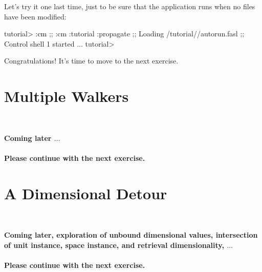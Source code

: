 \documentclass[10pt,twoside,english,pdftex]{article}
\begin{document}
Let's try it one last time, just to be sure that the application runs when no
files have been modified:
%
\W\supp
\begin{smallexample}
\textcolor{darkergray}{%
  tutorial> \textcolor{black}{:cm}
  ;; :cm :tutorial :propagate
  ;; Loading /tutorial//autorun.fasl
  ;; Control shell 1 started
     ...
  tutorial>}
\end{smallexample}

Congratulations!  It's time to move to the next exercise.


\T\markright{}%
\T\pagestyle{plain}
\T\cleardoublepage
\W{}
\T\pagestyle{fancy}
\T\thispagestyle{fancybottom}
\T\renewcommand{\headrulewidth}{0pt}
\section{Multiple Walkers}
\label{sec:multiple-walkers}%

\T\medskip
\T\fndocrule\\
\T\begin{center}
\textcolor{darkergray}{\textsf{\textbf{Coming later $\ldots$\\~\\ 
 Please continue with the next exercise.}}}
\T\end{center}
\T\fndocrule


\T\markright{}%
\T\pagestyle{plain}
\T\cleardoublepage
\W{}
\T\pagestyle{fancy}
\T\thispagestyle{fancybottom}
\T\renewcommand{\headrulewidth}{0pt}
\section{A Dimensional Detour}
\label{sec:detour}%


\T\medskip
\T\fndocrule\\
\T\begin{center}
\textcolor{darkergray}{\textsf{\textbf{Coming later, exploration of unbound
 dimensional values, intersection of unit instance, space instance, and retrieval
 dimensionality, $\ldots$\\~\\ 
 Please continue with the next exercise.}}}
\T\end{center}
\T\fndocrule
\end{document}
